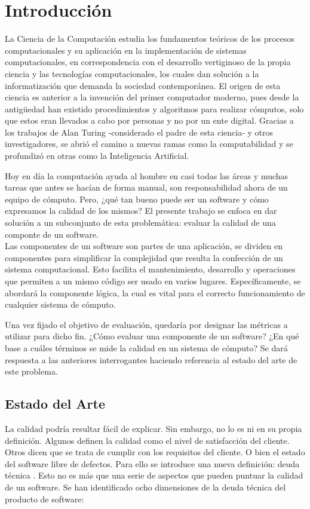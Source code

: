 \documentclass[a4paper,12pt]{book}
\begin{document}
\chapter{Introducción}

	La Ciencia de la Computación estudia los fundamentos teóricos de los procesos computacionales y su aplicación en la implementación de sistemas computacionales, en correspondencia con el desarrollo vertiginoso de la propia ciencia y las tecnologías computacionales, los cuales dan solución a la informatización que demanda la sociedad contemporánea. El origen de esta ciencia es anterior a la invención del primer computador moderno, pues desde la antigüedad han existido procedimientos y algoritmos para realizar cómputos, solo que estos eran llevados a cabo por personas y no por un ente digital. Gracias a los trabajos de Alan Turing \cite{Turing} -considerado el padre de esta ciencia- y otros investigadores, se abrió el camino a nuevas ramas como la computabilidad y se profundizó en otras como la Inteligencia Artificial.
	
	Hoy en día la computación ayuda al hombre en casi todas las áreas y muchas tareas que antes se hacían de forma manual, son responsabilidad ahora de un equipo de cómputo. Pero, ¿qué tan bueno puede ser un software y cómo expresamos la calidad de los mismos? El presente trabajo se enfoca en dar solución a un subconjunto de esta problemática: evaluar la calidad de una componte de un software. \\
	
	Las componentes de un software son partes de una aplicación, se dividen en componentes para simplificar la complejidad que resulta la confección de un sistema computacional. Esto facilita el mantenimiento, desarrollo y operaciones que permiten a un mismo código ser usado en varios lugares. Específicamente, se abordará la componente lógica, la cual es vital para el correcto funcionamiento de cualquier sistema de cómputo. 
	
	Una vez fijado el objetivo de evaluación, quedaría por designar las métricas a utilizar para dicho fin. ¿Cómo evaluar una componente de un software? ¿En qué base a cuáles términos se mide la calidad en un sistema de cómputo? Se dará respuesta a las anteriores interrogantes haciendo referencia al estado del arte de este problema.
	
	\section{Estado del Arte}
		La calidad podría resultar fácil de explicar. Sin embargo, no lo es ni en su propia definición. Algunos definen la calidad como el nivel de satisfacción del cliente. Otros dicen que se trata de cumplir con los requisitos del cliente. O bien el estado del software libre de defectos. Para ello se introduce una nueva definición: deuda técnica \cite{EAsoftwareevaluation}. Esto no es más que una serie de aspectos que pueden puntuar la calidad de un software. Se han identificado ocho dimensiones de la deuda técnica del producto de software:
		
\end{document}
